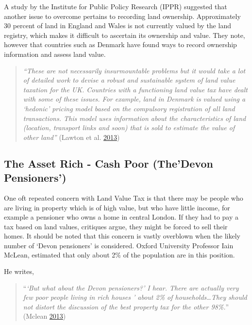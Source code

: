 \documentclass[]{tufte-handout}
\begin{document}
A study by the Institute for Public Policy Research (IPPR) suggested
that another issue to overcome pertains to recording land ownership.
Approximately 30 percent of land in England and Wales is not currently
valued by the land registry, which makes it difficult to ascertain its
ownership and value. They note, however that countries such as Denmark
have found ways to record ownership information and assess land value.

\begin{quote}
\emph{``These are not necessarily insurmountable problems but it would
take a lot of detailed work to devise a robust and sustainable system of
land value taxation for the UK. Countries with a functioning land value
tax have dealt with some of these issues. For example, land in Denmark
is valued using a `hedonic' pricing model based on the compulsory
registration of all land transactions. This model uses information about
the characteristics of land (location, transport links and soon) that is
sold to estimate the value of other land''} (Lawton et al.
\protect\hyperlink{ref-Lawton2013a}{2013})
\end{quote}

\hypertarget{the-asset-rich---cash-poor-thedevon-pensioners}{%
\subsection{The Asset Rich - Cash Poor (The'Devon
Pensioners')}\label{the-asset-rich---cash-poor-thedevon-pensioners}}

One oft repeated concern with Land Value Tax is that there may be people
who are living in property which is of high value, but who have little
income, for example a pensioner who owns a home in central London. If
they had to pay a tax based on land values, critiques argue, they might
be forced to sell their homes. It should be noted that this concern is
vastly overblown when the likely number of `Devon pensioners' is
considered. Oxford University Professor Iain McLean, estimated that only
about 2\% of the population are in this position.

He writes,

\begin{quote}
``\emph{`But what about the Devon pensioners?' I hear. There are
actually very few poor people living in rich houses ' about 2\% of
households\ldots{}They should not distort the discussion of the best
property tax for the other 98\%.}'' (Mclean
\protect\hyperlink{ref-Mclean2013}{2013})
\end{quote}
\end{document}
